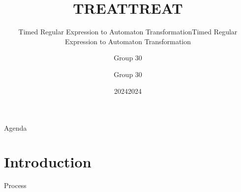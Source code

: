 \documentclass{beamer}
\title{TREAT}
\subtitle{Timed Regular Expression to Automaton Transformation}
\author{Group 30}
\institute{Aalborg Universitet}
\date{2024}
\title{TREAT}
\subtitle{Timed Regular Expression to Automaton Transformation}
\author{Group 30}
\institute{Aalborg Universitet}
\date{2024}
\begin{document}
\frame{\titlepage}

\begin{frame}{Agenda}
    \tableofcontents
\end{frame}

\section{Introduction} %
\begin{frame} {Process}

\end{frame}


\end{document}
